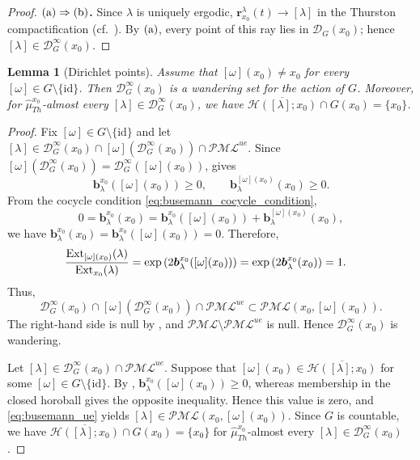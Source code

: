 \documentclass[dvipdfmx]{amsart}
\newtheorem{lemma}{Lemma}[section]
\theoremstyle{remark}
\newcommand{\ext}{{\rm Ext}}
\newcommand{\PThursM}{\hat{\mu}_{Th}}
\newcommand{\ray}{{\boldsymbol r}}
\newcommand{\pml}{\mathcal{PML}}
\newcommand{\busemann}{\boldsymbol{b}}
\newcommand{\Dirichlet}{\mathscr{D}}
\newcommand{\horos}{\mathscr{H}}
\begin{document}
\begin{proof}
\medskip
\noindent
\textbf{${\rm (a)}\Rightarrow {\rm (b)}$.}
Since $\lambda$ is uniquely ergodic, $\ray^\lambda_{x_0}(t)\to[\lambda]$ in the Thurston compactification (cf.\ \cite{Masur1980}). By ${\rm (a)}$, every point of this ray lies in $\Dirichlet_G(x_0)$; hence $[\lambda]\in\Dirichlet^\infty_G(x_0)$.
\end{proof}

\begin{lemma}[Dirichlet points]
\label{lem:almost-unique}
Assume that $[\omega](x_0)\ne x_0$ for every $[\omega]\in G\setminus\{\mathrm{id}\}$.
Then $\Dirichlet^\infty_G(x_0)$ is a wandering set for the action of $G$. Moreover, for $\PThursM^{x_0}$-almost every $[\lambda]\in\Dirichlet^\infty_G(x_0)$, we have $\overline{\horos([\lambda];x_0)}\cap G(x_0)=\{x_0\}$.
\end{lemma}

\begin{proof}
Fix $[\omega]\in G\setminus\{\mathrm{id}\}$ and let $[\lambda]\in \Dirichlet^\infty_G(x_0)\cap [\omega](\Dirichlet^\infty_G(x_0))\cap \pml^{ue}$.
Since $[\omega](\Dirichlet^\infty_G(x_0))=
\Dirichlet^\infty_G([\omega](x_0))$,  gives
\[
\busemann^{x_0}_\lambda([\omega](x_0))\ge0,
\qquad
\busemann^{[\omega](x_0)}_\lambda(x_0)\ge0.
\]
From the cocycle condition \eqref{eq:busemann_cocycle_condition},
\[
0=\busemann^{x_0}_\lambda(x_0)=\busemann^{x_0}_\lambda([\omega](x_0))+\busemann^{[\omega](x_0)}_\lambda(x_0),
\]
we have $\busemann^{x_0}_\lambda(x_0)=\busemann^{x_0}_\lambda([\omega](x_0))=0$.
Therefore,
\begin{align*}
\frac{\ext_{[\omega](x_0)}(\lambda)}{\ext_{x_0}(\lambda)}
&=\exp\left(2\busemann^{x_0}_\lambda([\omega](x_0))\right)=\exp\left(2\busemann^{x_0}_\lambda(x_0)\right)=1.
\end{align*}
Thus,
\[
\Dirichlet^\infty_G(x_0)\cap
[\omega](\Dirichlet^\infty_G(x_0))\cap\pml^{ue}
\subset\pml(x_0,[\omega](x_0)).
\]
The right-hand side is null by , and
$\pml\setminus\pml^{ue}$ is null. Hence
$\Dirichlet^\infty_G(x_0)$ is wandering.

Let $[\lambda]\in\Dirichlet^\infty_G(x_0)\cap\pml^{ue}$.
Suppose that $[\omega](x_0)\in\overline{\horos([\lambda];x_0)}$ for some $[\omega]\in G\setminus\{\mathrm{id}\}$. 
By ,
$\busemann^{x_0}_\lambda([\omega](x_0))\ge0$, whereas membership in the
closed horoball gives the opposite inequality. Hence this value is zero,
and \eqref{eq:busemann_ue} yields
$[\lambda]\in\pml(x_0,[\omega](x_0))$. 
Since $G$ is countable, 
we have $\overline{\horos([\lambda];x_0)}\cap G(x_0)=\{x_0\}$ for $\PThursM^{x_0}$-almost every $[\lambda]\in \Dirichlet^{\infty}_G(x_0)$.
\end{proof}
\end{document}
